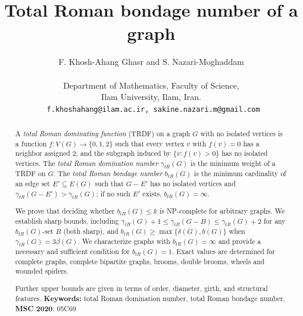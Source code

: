 \documentclass[12pt,reqno]{amsart}
\theoremstyle{plain}
\numberwithin{equation}{section}
\begin{document}
\title[Total Roman bondage number of a graph]{Total Roman bondage number of a graph}
\author[]{  F. Khosh-Ahang Ghasr     and S. Nazari-Moghaddam\\\vspace{2mm}\\Department of Mathematics, Faculty of Science, \\ Ilam University,
Ilam, Iran.\\\texttt{ f.khoshahang@ilam.ac.ir, sakine.nazari.m@gmail.com}\vspace{4mm}
  }

\begin{abstract}
A \emph{total Roman dominating function} (TRDF) on a graph $G$ with no isolated vertices is a function $f:V(G)\to\{0,1,2\}$ such that every vertex $v$ with $f(v)=0$ has a neighbor assigned $2$, and the subgraph induced by $\{v:f(v)>0\}$ has no isolated vertices. The \emph{total Roman domination number} $\gamma_{tR}(G)$ is the minimum weight of a TRDF on $G$. The \emph{total Roman bondage number} $b_{tR}(G)$ is the minimum cardinality of an edge set $E'\subseteq E(G)$ such that $G-E'$ has no isolated vertices and $\gamma_{tR}(G-E')>\gamma_{tR}(G)$; if no such $E'$ exists, $b_{tR}(G)=\infty$.

We prove that deciding whether $b_{tR}(G)\leq k$ is NP-complete for arbitrary graphs. We establish sharp bounds, including $\gamma_{tR}(G)+1\leq \gamma_{tR}(G-B)\leq \gamma_{tR}(G)+2$ for any $b_{tR}(G)$-set $B$ (both sharp), and $b_{tR}(G)\geq \max\{\delta(G),b(G)\}$ when $\gamma_{tR}(G)=3\beta(G)$. We characterize graphs with $b_{tR}(G)=\infty$ and provide a necessary and sufficient condition for $b_{tR}(G)=1$. Exact values are determined for complete graphs, complete bipartite graphs, brooms, double brooms, wheels and wounded spiders. 

Further upper bounds are given in terms of order, diameter, girth, and structural features.
 \newline
\newline
\noindent \textbf{Keywords:} total Roman domination number, total Roman bondage number.
\newline
\textbf{MSC 2020}: 05C69
\end{abstract}

\end{document}
